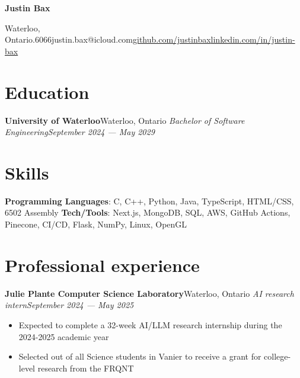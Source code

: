 \documentclass{article}
\newcommand{\cdelim}{\;\textbar\;}
\newcommand{\newrole}[4]{
    {\normalfont\textbf{#1}\hfill#3}
    \newline
    \textit{#2}\hfill\textit{#4}
}
\newenvironment{bulletpoints}{\begin{itemize}\setlength\itemsep{-0.3em}}{\end{itemize}}
\begin{document}
\begin{center}
    {\Huge\bfseries Justin Bax}\\\vspace*{2pt}

    Waterloo, Ontario\cdelim 438.763.6066\cdelim justin.bax@icloud.com\cdelim\href{https://github.com/justinbax}{github.com/justinbax}\cdelim\href{https://linkedin.com/in/justin-bax}{linkedin.com/in/justin-bax}\\
\end{center}

\section*{Education}

\newrole{University of Waterloo}{Bachelor of Software Engineering}{Waterloo, Ontario}{September 2024 --- May 2029}


\section*{Skills}

{\bfseries Programming Languages}: C, C++, Python, Java, TypeScript, HTML/CSS, 6502 Assembly
\newline
{\bfseries Tech/Tools}: Next.js, MongoDB, SQL, AWS, GitHub Actions, Pinecone, CI/CD, Flask, NumPy, Linux, OpenGL


\section*{Professional experience}

\newrole{Julie Plante Computer Science Laboratory}{AI research intern}{Waterloo, Ontario}{September 2024 --- May 2025}
\begin{bulletpoints}
    \item Expected to complete a 32-week AI/LLM research internship during the 2024-2025 academic year
    \item Selected out of all Science students in Vanier to receive a grant for college-level research from the FRQNT
\end{bulletpoints}
\end{document}
